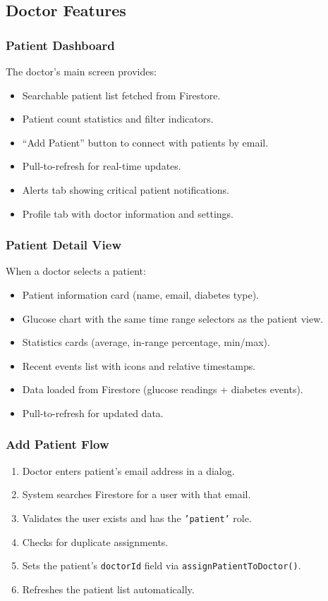 \documentclass[12pt,a4paper]{article}
\begin{document}
\subsection{Doctor Features}

\subsubsection{Patient Dashboard}
The doctor's main screen provides:
\begin{itemize}
    \item Searchable patient list fetched from Firestore.
    \item Patient count statistics and filter indicators.
    \item ``Add Patient'' button to connect with patients by email.
    \item Pull-to-refresh for real-time updates.
    \item Alerts tab showing critical patient notifications.
    \item Profile tab with doctor information and settings.
\end{itemize}

\subsubsection{Patient Detail View}
When a doctor selects a patient:
\begin{itemize}
    \item Patient information card (name, email, diabetes type).
    \item Glucose chart with the same time range selectors as the patient view.
    \item Statistics cards (average, in-range percentage, min/max).
    \item Recent events list with icons and relative timestamps.
    \item Data loaded from Firestore (glucose readings + diabetes events).
    \item Pull-to-refresh for updated data.
\end{itemize}

\subsubsection{Add Patient Flow}
\begin{enumerate}
    \item Doctor enters patient's email address in a dialog.
    \item System searches Firestore for a user with that email.
    \item Validates the user exists and has the \texttt{'patient'} role.
    \item Checks for duplicate assignments.
    \item Sets the patient's \texttt{doctorId} field via \texttt{assignPatientToDoctor()}.
    \item Refreshes the patient list automatically.
\end{enumerate}
\end{document}

